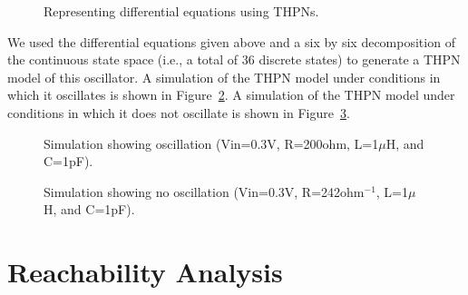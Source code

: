 \documentclass[11pt,times]{article}
\begin{document}
\begin{figure}[htbp]
\begin{center}
{\caption{\label{region} Representing differential equations using THPNs.}}
\end{center}
\end{figure}

We used the differential equations given above and a six by six
decomposition of the continuous state space (i.e., a total of 36 discrete 
states) to generate a THPN model of this oscillator.  A simulation of the THPN 
model under conditions in which it oscillates is shown in Figure~\ref{sim1}.  
A simulation of the THPN model under conditions in which it does not oscillate
is shown in Figure~\ref{sim2}.

\begin{figure}[htbp]
\begin{center}
{\caption{\label{sim1} Simulation showing oscillation (Vin=0.3V, 
R=200ohm, L=1$\mu$H, and C=1pF).}}
\end{center}
\end{figure}

\begin{figure}[htbp]
\begin{center}
{\caption{\label{sim2} Simulation showing no oscillation (Vin=0.3V, 
R=242ohm$^{-1}$, L=1$\mu$H, and C=1pF).}}
\end{center}
\end{figure}



\section{Reachability Analysis}
\end{document}
